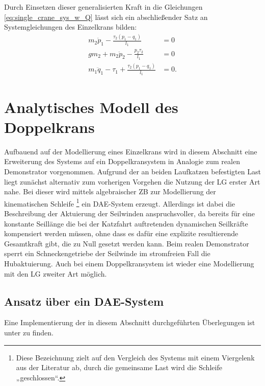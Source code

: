 Durch Einsetzen dieser generalisierten Kraft in die Gleichungen \eqref{eq:single_crane_sys_w_Q} lässt sich ein abschließender Satz an Systemgleichungen des Einzelkrans bilden:
\begin{subequations}
	\label{single_flat_syseqs}
	\begin{align}
		m_{2} \ddot{p}_{1} - \frac{\tau_{2} \left(p_{1} - q_{1}\right)}{l_{1}} &= 0 \label{single_flat_syseq1}\\
		g m_{2} + m_{2} \ddot{p}_{2} - \frac{p_{2} \tau_{2}}{l_{1}} &= 0\label{single_flat_syseq2}\\
		m_{1} \ddot{q}_{1} - \tau_{1} + \frac{\tau_{2} \left(p_{1} - q_{1}\right)}{l_{1}} &= 0\label{single_flat_syseq3}.
	\end{align}
\end{subequations}


\section{Analytisches Modell des Doppelkrans}
Aufbauend auf der Modellierung eines Einzelkrans wird in diesem Abschnitt eine Erweiterung des Systems auf ein Doppelkransystem in Analogie zum realen Demonstrator vorgenommen. Aufgrund der an beiden Laufkatzen befestigten Last liegt zunächst alternativ zum vorherigen Vorgehen die Nutzung der LG erster Art nahe. Bei dieser wird mittels algebraischer ZB zur Modellierung der kinematischen Schleife \footnote{Diese Bezeichnung zielt auf den Vergleich des Systems mit einem Viergelenk aus der Literatur ab, durch die gemeinsame Last wird die Schleife „geschlossen“.} ein DAE-System erzeugt. Allerdings ist dabei die Beschreibung der Aktuierung der Seilwinden anspruchsvoller, da bereits für eine konstante Seillänge die bei der Katzfahrt auftretenden dynamischen Seilkräfte kompensiert werden müssen, ohne dass es dafür eine explizite resultierende Gesamtkraft gibt, die zu Null gesetzt werden kann. Beim realen Demonstrator sperrt ein Schneckengetriebe der Seilwinde im stromfreien Fall die Hubaktuierung. Auch bei einem Doppelkransystem ist wieder eine Modellierung mit den LG zweiter Art möglich.

\subsection{Ansatz über ein DAE-System}
Eine Implementierung der in diesem Abschnitt durchgeführten Überlegungen ist unter \cite[double\_crane\_notebooks/DAE\_double\_crane\_cartesian.ipynb]{SAGithub} zu finden.

